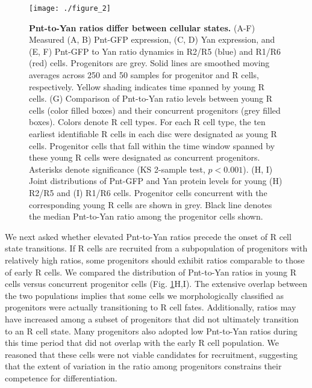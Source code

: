 \begin{figure}[h!]
\centering
\vspace{0pt}
\texttt{[image: ./figure\_2]}
\caption[Pnt-to-Yan ratios differ between cellular states.]{\textbf{Pnt-to-Yan ratios differ between cellular states.} (A-F) Measured (A, B) Pnt-GFP expression, (C, D) Yan expression, and (E, F) Pnt-GFP to Yan ratio dynamics in R2/R5 (blue) and R1/R6 (red) cells. Progenitors are grey. Solid lines are smoothed moving averages across 250 and 50 samples for progenitor and R cells, respectively. Yellow shading indicates time spanned by young R cells. (G) Comparison of Pnt-to-Yan ratio levels between young R cells (color filled boxes) and their concurrent progenitors (grey filled boxes). Colors denote R cell types. For each R cell type, the ten earliest identifiable R cells in each disc were designated as young R cells. Progenitor cells that fall within the time window spanned by these young R cells were designated as concurrent progenitors. Asterisks denote significance (KS 2-sample test, $p<0.001$). (H, I) Joint distributions of Pnt-GFP and Yan protein levels for young (H) R2/R5 and (I) R1/R6 cells. Progenitor cells concurrent with the corresponding young R cells are shown in grey. Black line denotes the median Pnt-to-Yan ratio among the progenitor cells shown.}
\label{fig:ratio:fig2}
\end{figure}

We next asked whether elevated Pnt-to-Yan ratios precede the onset of R cell state transitions. If R cells are recruited from a subpopulation of progenitors with relatively high ratios, some progenitors should exhibit ratios comparable to those of early R cells. We compared the distribution of Pnt-to-Yan ratios in young R cells versus concurrent progenitor cells (Fig. \ref{fig:ratio:fig2}H,I). The extensive overlap between the two populations implies that some cells we morphologically classified as progenitors were actually transitioning to R cell fates. Additionally, ratios may have increased among a subset of progenitors that did not ultimately transition to an R cell state. Many progenitors also adopted low Pnt-to-Yan ratios during this time period that did not overlap with the early R cell population. We reasoned that these cells were not viable candidates for recruitment, suggesting that the extent of variation in the ratio among progenitors constrains their competence for differentiation.

